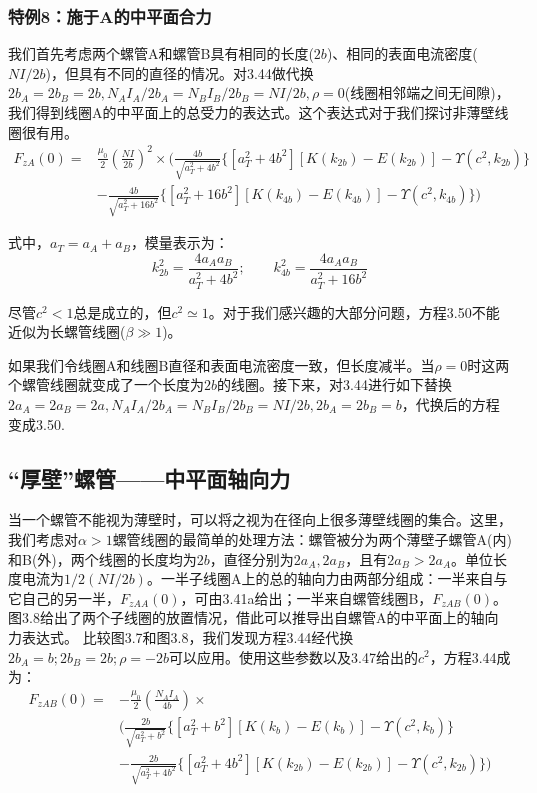 \subsubsection{特例8：施于A的中平面合力}
我们首先考虑两个螺管A和螺管B具有相同的长度($2b$)、相同的表面电流密度($NI/2b$)，但具有不同的直径的情况。对3.44做代换$2b_A = 2b_B = 2b, N_A I_A/2b_A = N_B I_B/2b_B = N I/2b,\rho=0$(线圈相邻端之间无间隙)，我们得到线圈A的中平面上的总受力的表达式。这个表达式对于我们探讨非薄壁线圈很有用。
\begin{equation}
\begin{split}
F_{zA}(0)=&\frac{\mu_0}{2}(\frac{NI}{2b})^2\times\bigg(\frac{4b}{\sqrt{a_T^2+4b^2}} \{[a_T^2+4b^2][K(k_{2b})-E(k_{2b})]-\Upsilon(c^2,k_{2b}) \}\\
&-\frac{4b}{\sqrt{a_T^2+16b^2}} \{[a_T^2+16b^2][K(k_{4b})-E(k_{4b})]-\Upsilon(c^2,k_{4b}) \}\bigg)
\end{split}
\end{equation}

式中，$a_T=a_A+a_B$，模量表示为：
$$k_{2b}^2=\frac{4a_A a_B}{a_T^2+4b^2} ; \qquad k_{4b}^2=\frac{4a_A a_B}{a_T^2+16b^2} $$

尽管$c^2<1$总是成立的，但$c^2\simeq 1$。对于我们感兴趣的大部分问题，方程3.50不能近似为长螺管线圈($\beta\gg 1$)。

如果我们令线圈A和线圈B直径和表面电流密度一致，但长度减半。当$\rho=0$时这两个螺管线圈就变成了一个长度为$2b$的线圈。接下来，对3.44进行如下替换$2a_A=2a_B=
2a, N_A I_A/2b_A = N_B I_B/2b_B = NI/2b,2b_A = 2b_B = b$，代换后的方程变成3.50.

\subsection{“厚壁”螺管——中平面轴向力}
当一个螺管不能视为薄壁时，可以将之视为在径向上很多薄壁线圈的集合。这里，我们考虑对$\alpha>1$螺管线圈的最简单的处理方法：螺管被分为两个薄壁子螺管A(内)和B(外)，两个线圈的长度均为$2b$，直径分别为$2a_A,2a_B$，且有$2a_B >2a_A$。单位长度电流为$1/2(NI/2b)$。一半子线圈A上的总的轴向力由两部分组成：一半来自与它自己的另一半，$F_{zAA}(0)$，可由3.41a给出；一半来自螺管线圈B，$F_{zAB}(0)$。图3.8给出了两个子线圈的放置情况，借此可以推导出自螺管A的中平面上的轴向力表达式。
比较图3.7和图3.8，我们发现方程3.44经代换$2b_A = b; 2b_B = 2b; \rho = −2b$可以应用。使用这些参数以及3.47给出的$c^2$，方程3.44成为：
\begin{equation}
\begin{split}
F_{zAB}(0)=&-\frac{\mu_0}{2}(\frac{N_A I_A}{4b})\times \\
&\bigg(\frac{2b}{\sqrt{a_T^2+b^2}} \{[a_T^2+b^2][K(k_{b})-E(k_{b})]-\Upsilon(c^2,k_b)\}\\
&-\frac{2b}{\sqrt{a_T^2+4b^2}} \{[a_T^2+4b^2][K(k_{2b})-E(k_{2b})]-\Upsilon(c^2,k_{2b}) \}\bigg)
\end{split}
\end{equation}

